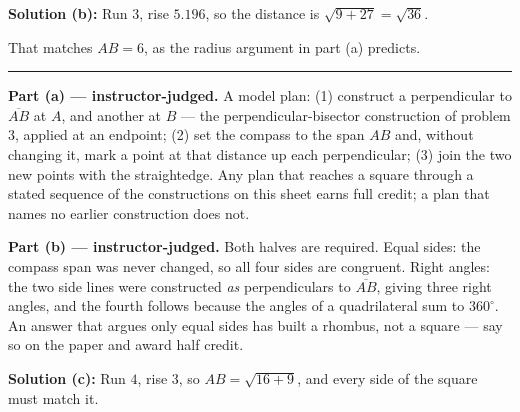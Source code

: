 \documentclass[12pt]{article}
\begin{document}
\textbf{Solution (b):} Run $3$, rise $5.196$, so the distance is
$\sqrt{9 + 27} = \sqrt{36}$. 

\noindent That matches $AB = 6$, as the radius argument in part (a) predicts.

\vspace{0.15cm}
\noindent\rule{\linewidth}{0.2pt}


\textbf{Part (a) --- instructor-judged.} A model plan: (1) construct a
perpendicular to $\overline{AB}$ at $A$, and another at $B$ --- the
perpendicular-bisector construction of problem 3, applied at an endpoint;
(2) set the compass to the span $AB$ and, without changing it, mark a point at
that distance up each perpendicular; (3) join the two new points with the
straightedge. Any plan that reaches a square through a stated sequence of the
constructions on this sheet earns full credit; a plan that names no earlier
construction does not.

\textbf{Part (b) --- instructor-judged.} Both halves are required. Equal sides:
the compass span was never changed, so all four sides are congruent. Right
angles: the two side lines were constructed \emph{as} perpendiculars to
$\overline{AB}$, giving three right angles, and the fourth follows because the
angles of a quadrilateral sum to $360^\circ$. An answer that argues only equal
sides has built a rhombus, not a square --- say so on the paper and award half
credit.

\textbf{Solution (c):} Run $4$, rise $3$, so $AB = \sqrt{16 + 9}$, and every
side of the square must match it. 
\end{document}

